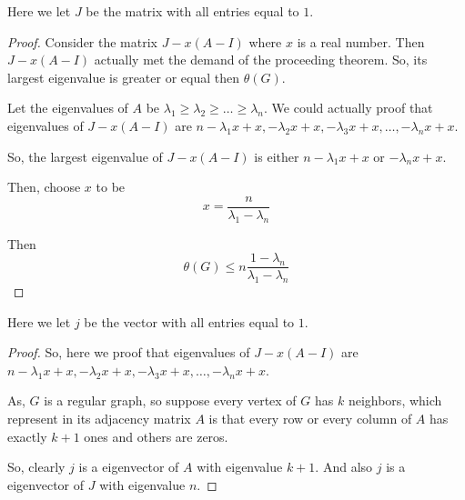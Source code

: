 \documentclass{beamer}
\begin{document}
                  \begin{frame}
                        Here we let $J$ be the matrix with all entries equal to $1$.

                        \begin{proof}
                              Consider the matrix $J - x(A-I)$ where $x$ is a real number. Then $J - x(A-I)$ actually met the demand of the proceeding theorem. So, its largest eigenvalue is greater or equal then $\theta(G)$.

                              Let the eigenvalues of $A$ be $\lambda_{1}\ge\lambda_{2}\ge\dots\ge\lambda_{n}$. We could actually proof that eigenvalues of $J - x(A-I)$ are $n-\lambda_{1}x+x,-\lambda_{2}x+x,-\lambda_{3}x+x,\dots,-\lambda_{n}x+x$. 
                              
                              So, the largest eigenvalue of $J - x(A-I)$ is either $n-\lambda_{1}x+x$ or $-\lambda_{n}x+x$.

                              Then, choose $x$ to be
                              \begin{equation}
                                    x = \frac{n}{\lambda_{1}-\lambda_{n}}
                              \end{equation}

                              Then
                              \begin{equation}
                                    \theta(G) \le n\frac{1-\lambda_{n}}{\lambda_{1}-\lambda_{n}}
                              \end{equation}
                        \end{proof}
                  \end{frame}

                  \begin{frame}
                        Here we let $j$ be the vector with all entries equal to $1$.

                        \begin{proof}
                              So, here we proof that eigenvalues of $J - x(A-I)$ are $n-\lambda_{1}x+x,-\lambda_{2}x+x,-\lambda_{3}x+x,\dots,-\lambda_{n}x+x$. 

                              As, $G$ is a regular graph, so suppose every vertex of $G$ has $k$ neighbors, which represent in its adjacency matrix $A$ is that every row or every column of $A$ has exactly $k+1$ ones and others are zeros.

                              So, clearly $j$ is a eigenvector of $A$ with eigenvalue $k+1$. And also $j$ is a eigenvector of $J$ with eigenvalue $n$.

                        \end{proof}
                  \end{frame}
\end{document}
